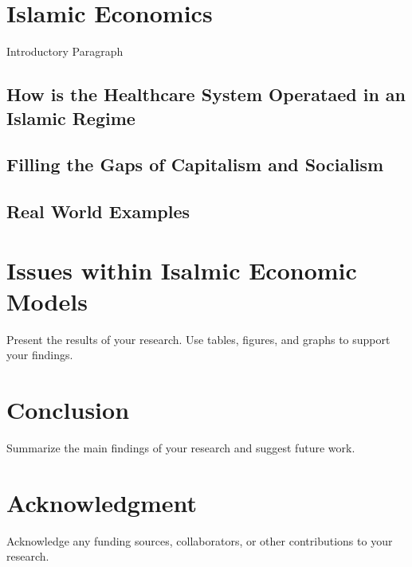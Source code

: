 \documentclass[conference]{IEEEtran}
\begin{document}
\section{Islamic Economics}
Introductory Paragraph
\subsection{How is the Healthcare System Operataed in an Islamic Regime}
\subsection{Filling the Gaps of Capitalism and Socialism}
\subsection{Real World Examples}

\section{Issues within Isalmic Economic Models}
Present the results of your research. Use tables, figures, and graphs to support your findings.

\section{Conclusion}
Summarize the main findings of your research and suggest future work.

\section*{Acknowledgment}
Acknowledge any funding sources, collaborators, or other contributions to your research.



\end{document}
